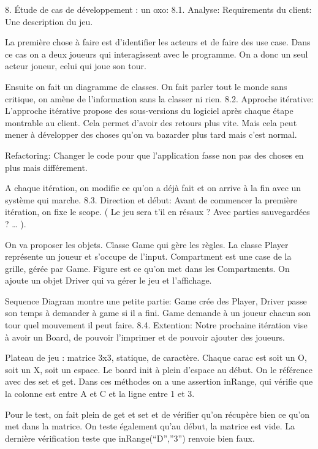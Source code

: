 8. Étude de cas de développement : un oxo:
8.1. Analyse:
Requirements du client: Une description du jeu.

La première chose à faire est d’identifier les acteurs et de faire des use case. Dans ce cas on a deux joueurs qui interagissent avec le programme. On a donc un seul acteur joueur, celui qui joue son tour.

Ensuite on fait un diagramme de classes. On fait parler tout le monde sans critique, on amène de l’information sans la classer ni rien.
8.2. Approche itérative:
L’approche itérative propose des sous-versions du logiciel après chaque étape montrable au client. Cela permet d’avoir des retours plus vite. Mais cela peut mener à développer des choses qu’on va bazarder plus tard mais c’est normal.

Refactoring: Changer le code pour que l’application fasse non pas des choses en plus mais différement.

A chaque itération, on modifie ce qu’on a déjà fait et on arrive à la fin avec un système qui marche.
8.3. Direction et début:
Avant de commencer la première itération, on fixe le scope. ( Le jeu sera t’il en résaux ? Avec parties sauvegardées ? … ).

On va proposer les objets. Classe Game qui gère les règles. La classe Player représente un joueur et s’occupe de l’input. Compartment est une case de la grille, gérée par Game. Figure est ce qu’on met dans les Compartments. On ajoute un objet Driver qui va gérer le jeu et l’affichage.

Sequence Diagram montre une petite partie: Game crée des Player, Driver passe son temps à demander à game si il a fini. Game demande à un joueur chacun son tour quel mouvement il peut faire.
8.4. Extention:
Notre prochaine itération vise à avoir un Board, de pouvoir l’imprimer et de pouvoir ajouter des joueurs.

Plateau de jeu : matrice 3x3, statique, de caractère. Chaque carac est soit un O, soit un X, soit un espace. Le board init à plein d’espace au début. On le référence avec des set et get.
Dans ces méthodes on a une assertion inRange, qui vérifie que la colonne est entre A et C et la ligne entre 1 et 3.

Pour le test, on fait plein de get et set et de vérifier qu’on récupère bien ce qu’on met dans la matrice. On teste également qu’au début, la matrice est vide. La dernière vérification teste que inRange(“D”,”3”) renvoie bien faux.